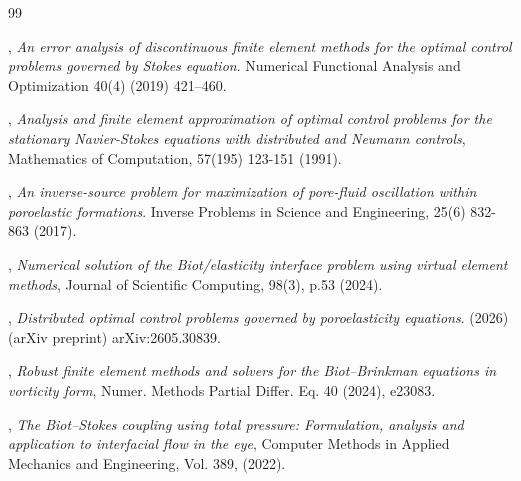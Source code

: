 \documentclass[smallextended]{svjour3}
\numberwithin{equation}{section}
\numberwithin{figure}{section}
\numberwithin{table}{section}
\begin{document}
\begin{thebibliography}{99}
				
		, {\it An error analysis of discontinuous finite element methods for the optimal control problems governed by Stokes equation}. Numerical Functional Analysis and Optimization 40(4) (2019) 421--460.
				
				

        , {\it Analysis and finite element approximation of optimal control problems for the stationary Navier-Stokes equations with distributed and Neumann controls}, Mathematics of Computation, 57(195)  123-151 (1991).

        , {\it An inverse-source problem for maximization of pore-fluid oscillation within poroelastic formations}. Inverse Problems in Science and Engineering, 25(6) 832-863 (2017).

        , {\it Numerical solution of the Biot/elasticity interface problem using virtual element methods}, Journal of Scientific Computing, 98(3), p.53 (2024).

        , {\it Distributed optimal control problems governed by poroelasticity equations}. (2026) (arXiv preprint) arXiv:2605.30839.

        , {\it Robust finite element methods and solvers for the Biot–Brinkman equations in vorticity form}, Numer. Methods Partial Differ. Eq. 40 (2024), e23083.

        , {\it The Biot–Stokes coupling using total pressure: Formulation, analysis and application to interfacial flow in the eye}, Computer Methods in Applied Mechanics and Engineering, Vol. 389, (2022).

        

\end{thebibliography}
\end{document}
